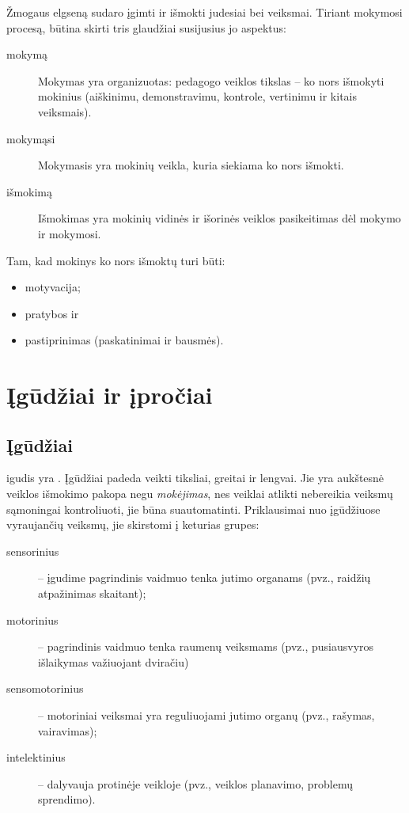 Žmogaus elgseną sudaro įgimti ir išmokti judesiai bei veiksmai. Tiriant 
mokymosi procesą, būtina skirti tris glaudžiai susijusius jo aspektus: 
\begin{description}
  \item[mokymą] Mokymas yra organizuotas: pedagogo veiklos tikslas –
    ko nors išmokyti mokinius (aiškinimu, demonstravimu, kontrole,
    vertinimu ir kitais veiksmais).
  \item[mokymąsi] Mokymasis yra mokinių veikla, kuria siekiama ko nors
    išmokti.
  \item[išmokimą] Išmokimas yra mokinių vidinės ir išorinės veiklos
    pasikeitimas dėl mokymo ir mokymosi.
\end{description}
Tam, kad mokinys ko nors išmoktų turi būti:
\begin{itemize}
  \item motyvacija;
  \item pratybos ir
  \item pastiprinimas (paskatinimai ir bausmės).
\end{itemize}

\section{Įgūdžiai ir įpročiai}

\subsection{Įgūdžiai}

\label{tema:igudziai}

\Gls{igudis} yra . Įgūdžiai padeda veikti tiksliai,
greitai ir lengvai. Jie yra aukštesnė veiklos išmokimo pakopa negu
\emph{mokėjimas}, nes veiklai atlikti nebereikia veiksmų sąmoningai
kontroliuoti, jie būna suautomatinti. Priklausimai nuo įgūdžiuose 
vyraujančių veiksmų, jie skirstomi į keturias grupes:
\begin{description}
  \item[sensorinius] – įgudime pagrindinis vaidmuo tenka jutimo organams 
    (pvz., raidžių atpažinimas skaitant);
  \item[motorinius] – pagrindinis vaidmuo tenka raumenų veiksmams (pvz., 
    pusiausvyros išlaikymas važiuojant dviračiu)
  \item[sensomotorinius] – motoriniai veiksmai yra reguliuojami jutimo 
    organų (pvz., rašymas, vairavimas);
  \item[intelektinius] –  dalyvauja protinėje veikloje (pvz., veiklos 
    planavimo, problemų sprendimo).
\end{description}

